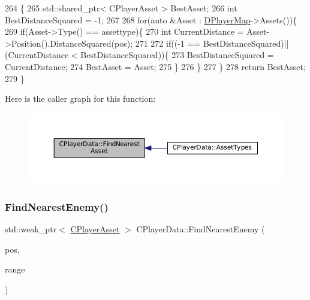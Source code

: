 \begin{DoxyCode}
264                                                                                                      \{
265     std::shared\_ptr< CPlayerAsset > BestAsset;
266     \textcolor{keywordtype}{int} BestDistanceSquared = -1;
267 
268     \textcolor{keywordflow}{for}(\textcolor{keyword}{auto} &Asset : \hyperlink{classCPlayerData_a452163191cd4603e1e38dd8d4bb9691c}{DPlayerMap}->Assets())\{
269         \textcolor{keywordflow}{if}(Asset->Type() == assettype)\{
270             \textcolor{keywordtype}{int} CurrentDistance = Asset->Position().DistanceSquared(pos);
271             
272             \textcolor{keywordflow}{if}((-1 == BestDistanceSquared)||(CurrentDistance < BestDistanceSquared))\{
273                 BestDistanceSquared = CurrentDistance;
274                 BestAsset = Asset;
275             \}
276         \}
277     \}
278     \textcolor{keywordflow}{return} BestAsset;
279 \}
\end{DoxyCode}
Here is the caller graph for this function\+:\nopagebreak
\begin{figure}[H]
\begin{center}
\leavevmode
\includegraphics[width=350pt]{classCPlayerData_a5f70ad16e9b4e8aa9edc6e8fc4136527_icgraph}
\end{center}
\end{figure}
\hypertarget{classCPlayerData_a5f0a1280933f7bb9a65ab256ecff1a69}{}\label{classCPlayerData_a5f0a1280933f7bb9a65ab256ecff1a69} 
\subsubsection{\texorpdfstring{Find\+Nearest\+Enemy()}{FindNearestEnemy()}}
{\footnotesize\ttfamily std\+::weak\+\_\+ptr$<$ \hyperlink{classCPlayerAsset}{C\+Player\+Asset} $>$ C\+Player\+Data\+::\+Find\+Nearest\+Enemy (\begin{DoxyParamCaption}\item[{const \hyperlink{classCPosition}{C\+Position} \&}]{pos,  }\item[{int}]{range }\end{DoxyParamCaption})}



